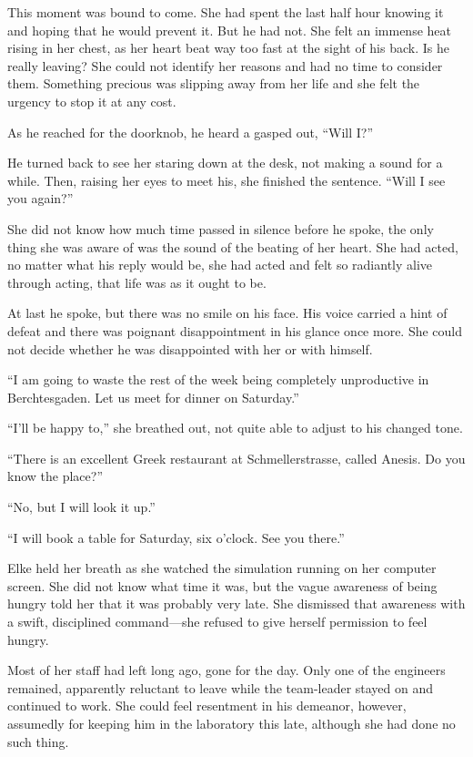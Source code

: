 This moment was bound to come. She had spent the last half hour knowing it and hoping that he would prevent it. But he had not. She felt an immense heat rising in her chest, as her heart beat way too fast at the sight of his back. Is he really leaving? She could not identify her reasons and had no time to consider them. Something precious was slipping away from her life and she felt the urgency to stop it at any cost.

As he reached for the doorknob, he heard a gasped out, ``Will I?''

He turned back to see her staring down at the desk, not making a sound for a while. Then, raising her eyes to meet his, she finished the sentence. ``Will I see you again?''

She did not know how much time passed in silence before he spoke, the only thing she was aware of was the sound of the beating of her heart. She had acted, no matter what his reply would be, she had acted and felt so radiantly alive through acting, that life was as it ought to be.

At last he spoke, but there was no smile on his face. His voice carried a hint of defeat and there was poignant disappointment in his glance once more. She could not decide whether he was disappointed with her or with himself.

``I am going to waste the rest of the week being completely unproductive in Berchtesgaden. Let us meet for dinner on Saturday.''

``I'll be happy to,'' she breathed out, not quite able to adjust to his changed tone.

``There is an excellent Greek restaurant at Schmellerstrasse, called Anesis. Do you know the place?''

``No, but I will look it up.''

``I will book a table for Saturday, six o'clock. See you there.''

\sectionline

Elke held her breath as she watched the simulation running on her computer screen. She did not know what time it was, but the vague awareness of being hungry told her that it was probably very late. She dismissed that awareness with a swift, disciplined command---she refused to give herself permission to feel hungry.

Most of her staff had left long ago, gone for the day. Only one of the engineers remained, apparently reluctant to leave while the team-leader stayed on and continued to work. She could feel resentment in his demeanor, however, assumedly for keeping him in the laboratory this late, although she had done no such thing.

